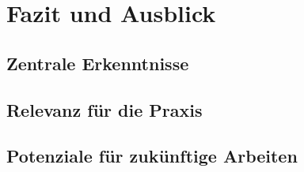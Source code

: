 \newpage

\section{Fazit und Ausblick}
\label{sec:fazit}

\subsection{Zentrale Erkenntnisse}
\label{subsec:erkenntnisse}

\subsection{Relevanz für die Praxis}
\label{subsec:praxis}

\subsection{Potenziale für zukünftige Arbeiten}
\label{subsec:zukunft}